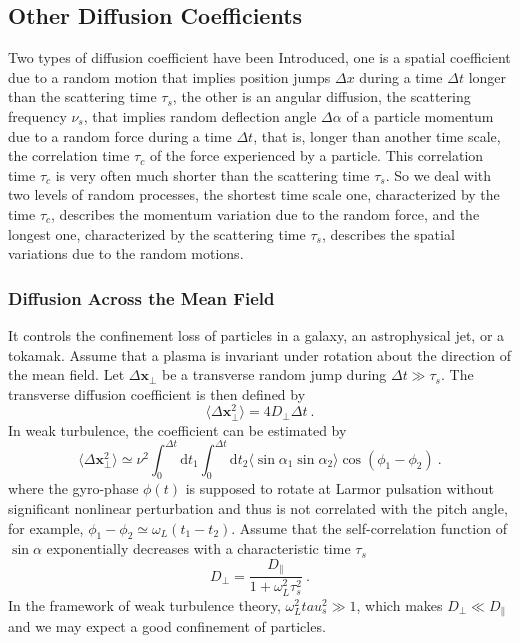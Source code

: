 \documentclass[12pt,a4paper]{article}
\renewcommand{\vec}[1]{\boldsymbol{#1}}
\newcommand{\dif}{\mathrm{d}}
\begin{document}
\subsection{Other Diffusion Coefficients}
Two types of diffusion coefficient have been Introduced, one is a spatial coefficient due to a random motion that implies position jumps $\Delta x$ during a time $\Delta t$ longer than the scattering time $\tau_s$, the other is an angular diffusion, the scattering frequency $\nu_s$, that implies random deflection angle $\Delta \alpha$ of a particle momentum due to a random force during a time $\Delta t$, that is, longer than another time scale, the correlation time $\tau_c$ of the force experienced by a particle. This correlation time $\tau_c$ is very often much shorter than the scattering time $\tau_s$. So we deal with two levels of random processes, the shortest time scale one, characterized by the time $\tau_c$, describes the momentum variation due to the random force, and the longest one, characterized by the scattering time $\tau_s$, describes the spatial variations due to the random motions. 


\subsubsection{Diffusion Across the Mean Field}
It controls the confinement loss of particles in a galaxy, an astrophysical jet, or a tokamak. Assume that a plasma is invariant under rotation about the direction of the mean field. Let $\Delta \vec{x}_\perp$ be a transverse random jump during $\Delta t \gg \tau_s$. The transverse diffusion coefficient is then defined by
\begin{equation}
\langle \Delta \vec{x}^2_\perp \rangle = 4D_\perp \Delta t ~.
\end{equation}
In weak turbulence, the coefficient can be estimated by
\begin{equation}
\langle \Delta \vec{x}^2_\perp \rangle \simeq \nu^2 \int_0^{\Delta t} \dif t_1 \int_0^{\Delta t} \dif t_2 \langle \sin \alpha_1 \sin \alpha_2 \rangle \cos (\phi_1 -\phi_2) ~.
\end{equation}
where the gyro-phase $\phi(t)$ is supposed to rotate at Larmor pulsation without significant nonlinear perturbation and thus is not correlated with the pitch angle, for example, $\phi_1 -\phi_2 \simeq \omega_L(t_1 - t_2)$. Assume that the self-correlation function of $\sin \alpha$ exponentially decreases with a characteristic time $\tau_s$
\begin{equation}
D_\perp = \frac{D_\parallel}{1+\omega_L^2 \tau_s^2} ~.
\end{equation}
In the framework of weak turbulence theory, $\omega^2_L tau^2_s \gg 1$, which makes $D_\perp \ll D_\parallel$ and we may expect a good confinement of particles. 
\end{document}
